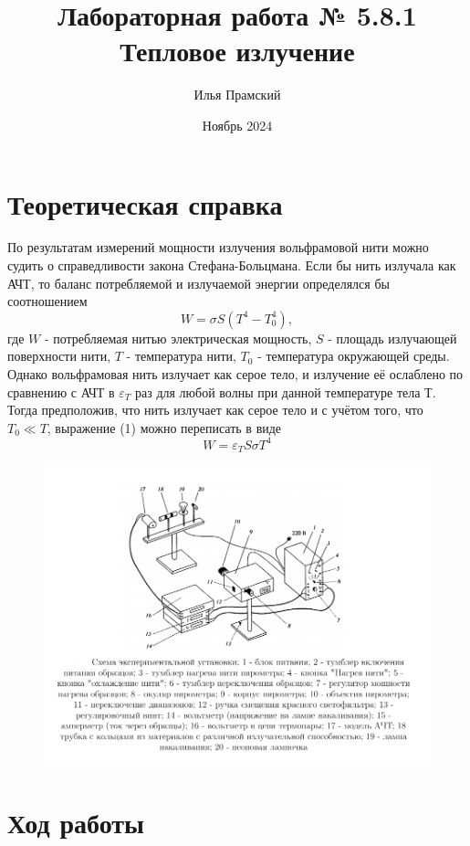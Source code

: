 \documentclass[a4paper,12pt]{article}
\title{Лабораторная работа № 5.8.1\\ Тепловое излучение}
\author{Илья Прамский}
\date{Ноябрь 2024}
\begin{document}
\maketitle
\newpage
\section{Теоретическая справка}

По результатам измерений мощности излучения вольфрамовой нити можно судить о справедливости закона Стефана-Больцмана. Если бы нить излучала как АЧТ, то баланс потребляемой и излучаемой энергии определялся бы соотношением 
\begin{equation}
    W = \sigma S (T^4 - T_0^4),
\end{equation}
где $W$ - потребляемая нитью электрическая мощность, $S$ - площадь излучающей поверхности нити, $T$ - температура нити, $T_0$ - температура окружающей среды. Однако вольфрамовая нить излучает как серое тело, и излучение её ослаблено по сравнению с АЧТ в $\varepsilon_T$ раз для любой волны при данной температуре тела Т. Тогда предположив, что нить излучает как серое тело и с учётом того, что $T_0 \ll T$, выражение (1) можно переписать в виде
\begin{equation}
    W = \varepsilon_T S \sigma T^4
\end{equation}

\begin{figure}[H]
\centering
\includegraphics[scale=0.75]{scheme.png}
\end{figure}
\newpage
\section{Ход работы}
\end{document}
